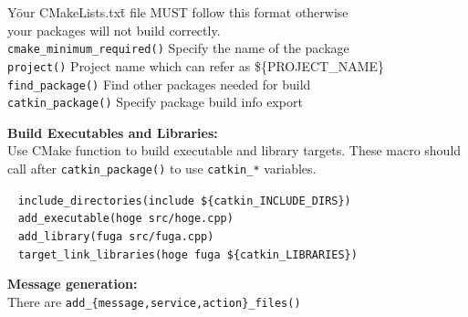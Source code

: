 \documentclass[10pt,landscape]{article}
\begin{document}
\begin{multicols}{3}
\begin{tabbing}
Y\=our CMakeLists.tx\=t file MUST follow this format otherwise\\ your
packages will not build correctly.\\
\> \texttt{cmake\_minimum\_required()} Specify the name of the package\\
\> \texttt{project()} Project name which can refer as \$\{PROJECT\_NAME\}\\
\> \texttt{find\_package()} \> Find other packages needed for build\\
\> \texttt{catkin\_package()} \> Specify package build info export\\
\end{tabbing}
\vspace{-3.5mm}
{\bf Build Executables and Libraries:}\\
Use CMake function to build executable and library targets. These
macro should call after \texttt{catkin\_package()} to use
\texttt{catkin\_*} variables.
\vspace{-1.5mm}
\begin{tabbing}
~ \texttt{include\_directories(include \$\{catkin\_INCLUDE\_DIRS\})}\\
~ \texttt{add\_executable(hoge src/hoge.cpp)}\\
~ \texttt{add\_library(fuga src/fuga.cpp)}\\
~ \texttt{target\_link\_libraries(hoge fuga \$\{catkin\_LIBRARIES\})}\\
\end{tabbing}
\vspace{-3.5mm}
{\bf Message generation:}\\
There are \texttt{add\_\{message,service,action\}\_files()}

\end{multicols}
\end{document}
